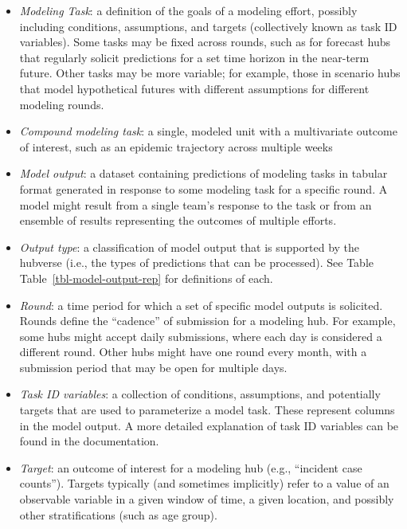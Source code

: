 \documentclass[
]{article}
\begin{document}
\begin{tcolorbox}[enhanced jigsaw, title=\textcolor{quarto-callout-tip-color}{\faLightbulb}\hspace{0.5em}{Keywords and definitions: Terminology from the hubverse}, coltitle=black, leftrule=.75mm, colframe=quarto-callout-tip-color-frame, left=2mm, colback=white, bottomrule=.15mm, colbacktitle=quarto-callout-tip-color!10!white, toptitle=1mm, breakable, opacityback=0, rightrule=.15mm, arc=.35mm, toprule=.15mm, bottomtitle=1mm, titlerule=0mm, opacitybacktitle=0.6]

\begin{itemize}
\item
  \emph{Modeling Task}: a definition of the goals of a modeling effort,
  possibly including conditions, assumptions, and targets (collectively
  known as task ID variables). Some tasks may be fixed across rounds,
  such as for forecast hubs that regularly solicit predictions for a set
  time horizon in the near-term future. Other tasks may be more
  variable; for example, those in scenario hubs that model hypothetical
  futures with different assumptions for different modeling rounds.
\item
  \emph{Compound modeling task}: a single, modeled unit with a
  multivariate outcome of interest, such as an epidemic trajectory
  across multiple weeks
\item
  \emph{Model output}: a dataset containing predictions of modeling
  tasks in tabular format generated in response to some modeling task
  for a specific round. A model might result from a single team's
  response to the task or from an ensemble of results representing the
  outcomes of multiple efforts.
\item
  \emph{Output type}: a classification of model output that is supported
  by the hubverse (i.e., the types of predictions that can be
  processed). See Table Table~\ref{tbl-model-output-rep} for definitions
  of each.
\item
  \emph{Round}: a time period for which a set of specific model outputs
  is solicited. Rounds define the ``cadence'' of submission for a
  modeling hub. For example, some hubs might accept daily submissions,
  where each day is considered a different round. Other hubs might have
  one round every month, with a submission period that may be open for
  multiple days.
\item
  \emph{Task ID variables}: a collection of conditions, assumptions, and
  potentially targets that are used to parameterize a model task. These
  represent columns in the model output. A more detailed explanation of
  task ID variables can be found in the documentation.
\item
  \emph{Target}: an outcome of interest for a modeling hub (e.g.,
  ``incident case counts''). Targets typically (and sometimes
  implicitly) refer to a value of an observable variable in a given
  window of time, a given location, and possibly other stratifications
  (such as age group).
\end{itemize}

\end{tcolorbox}
\end{document}
